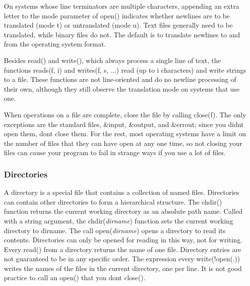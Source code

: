 On systems whose line terminators are multiple characters, appending an
extra letter to the mode parameter of \textsf{open()} indicates whether
newlines are to be translated (mode
\textsf{{\textquotedbl}t{\textquotedbl}}) or untranslated (mode
\textsf{{\textquotedbl}u{\textquotedbl}}). Text files generally need to
be translated, while binary files do not. The default is to translate
newlines to and from the operating system format.

Besides \textsf{read()} and \textsf{write()}, which always process a
single line of text, the functions \textsf{reads(f, i)} and
\textsf{writes(f, s, ...)} read (up to \textsf{i} characters) and write
strings to a file. These functions are not line-oriented and do no
newline processing of their own, although they still observe the
translation mode on systems that use one.

When operations on a file are complete, close the file by calling
\textsf{close(f)}. The only exceptions are the standard
files, \textsf{\&input}, \textsf{\&output}, and \textsf{\&errout};
since you didn{\textquotesingle}t open them, don{\textquotesingle}t
close them. For the rest, most operating systems have a limit on the
number of files that they can have open at any one time, so not closing
your files can cause your program to fail in strange ways if you use a
lot of files.

\subsubsection{Directories}

A directory is a special file that contains a
collection of named files. Directories can contain other directories to
form a hierarchical structure. The \textsf{chdir()}
function returns the current working directory as an absolute path
name. Called with a string argument, the
\textsf{chdir(}\textsf{\textit{dirname}}\textsf{)} function sets the
current working directory to \textsf{dirname}. The call
\textsf{open(}\textsf{\textit{dirname}}\textsf{)} opens a directory to
read its contents. Directories can only be opened for reading in this
way, not for writing. Every \textsf{read()} from a directory returns
the name of one file. Directory entries are not guaranteed to be in any
specific order. The expression \textsf{every
write(!open({\textquotedbl}.{\textquotedbl}))} writes the names of the
files in the current directory, one per line. It is not good practice
to call an \textsf{open()} that you don{\textquotesingle}t
\textsf{close()}.

